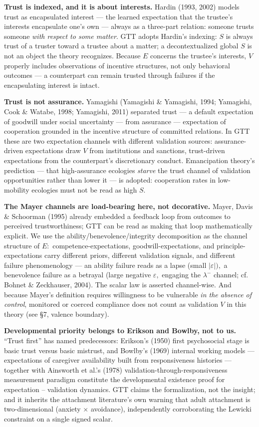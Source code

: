 \documentclass[11pt,twocolumn]{article}
\theoremstyle{gttdef}
\theoremstyle{gttplain}
\begin{document}
\textbf{Trust is indexed, and it is about interests.} Hardin (1993, 2002) models trust as encapsulated interest --- the learned expectation that the trustee's interests encapsulate one's own --- always as a three-part relation: someone trusts someone \emph{with respect to some matter}. GTT adopts Hardin's indexing: $S$ is always trust of a truster toward a trustee about a matter; a decontextualized global $S$ is not an object the theory recognizes. Because $E$ concerns the trustee's interests, $V$ properly includes observations of incentive structures, not only behavioral outcomes --- a counterpart can remain trusted through failures if the encapsulating interest is intact.

\textbf{Trust is not assurance.} Yamagishi (Yamagishi \& Yamagishi, 1994; Yamagishi, Cook \& Watabe, 1998; Yamagishi, 2011) separated trust --- a default expectation of goodwill under social uncertainty --- from assurance --- expectation of cooperation grounded in the incentive structure of committed relations. In GTT these are two expectation channels with different validation sources: assurance-driven expectations draw $V$ from institutions and sanctions, trust-driven expectations from the counterpart's discretionary conduct. Emancipation theory's prediction --- that high-assurance ecologies \emph{starve} the trust channel of validation opportunities rather than lower it --- is adopted: cooperation rates in low-mobility ecologies must not be read as high $S.$

\textbf{The Mayer channels are load-bearing here, not decorative.} Mayer, Davis \& Schoorman (1995) already embedded a feedback loop from outcomes to perceived trustworthiness; GTT can be read as making that loop mathematically explicit. We use the ability/benevolence/integrity decomposition as the channel structure of $E:$ competence-expectations, goodwill-expectations, and principle-expectations carry different priors, different validation signals, and different failure phenomenology --- an ability failure reads as a lapse (small $|\varepsilon|),$ a benevolence failure as a betrayal (large negative $\varepsilon,$ engaging the $\lambda^{-}$ channel; cf. Bohnet \& Zeckhauser, 2004). The scalar law is asserted channel-wise. And because Mayer's definition requires willingness to be vulnerable \emph{in the absence of control}, monitored or coerced compliance does not count as validation $V$ in this theory (see \S{}7, valence boundary).

\textbf{Developmental priority belongs to Erikson and Bowlby, not to us.} ``Trust first'' has named predecessors: Erikson's (1950) first psychosocial stage is basic trust versus basic mistrust, and Bowlby's (1969) internal working models --- expectations of caregiver availability built from responsiveness histories --- together with Ainsworth et al.'s (1978) validation-through-responsiveness measurement paradigm constitute the developmental existence proof for expectation -- validation dynamics. GTT claims the formalization, not the insight; and it inherits the attachment literature's own warning that adult attachment is two-dimensional (anxiety $\times$ avoidance), independently corroborating the Lewicki constraint on a single signed scalar.
\end{document}
